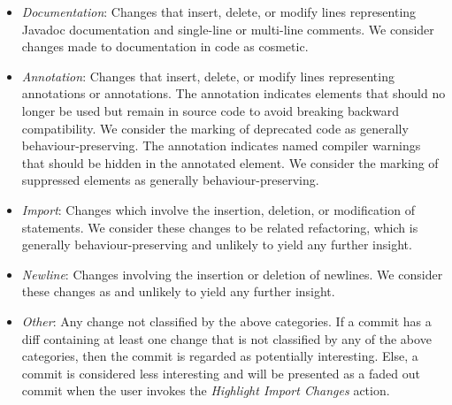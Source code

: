 \begin{itemize}
    \item \textit{Documentation}: Changes that insert, delete, or modify lines representing Javadoc documentation and single-line or multi-line comments. We consider changes made to documentation in code as cosmetic.
    \item \textit{Annotation}: \sloppy Changes that insert, delete, or modify lines representing  annotations or  annotations. The  annotation indicates elements that should no longer be used but remain in source code to avoid breaking backward compatibility. We consider the marking of deprecated code as generally behaviour-preserving. The  annotation indicates named compiler warnings that should be hidden in the annotated element. We consider the marking of  suppressed elements as generally behaviour-preserving.
    \item \textit{Import}: Changes which involve the insertion, deletion, or modification of  statements. We consider these changes to be related refactoring, which is generally behaviour-preserving and unlikely to yield any further insight.
    \item \textit{Newline}: Changes involving the insertion or deletion of newlines. We consider these changes as  and unlikely to yield any further insight.
    \item \textit{Other}: Any change not classified by the above categories. If a commit has a diff containing at least one change that is not classified by any of the above categories, then the commit is regarded as potentially interesting. Else, a commit is considered less interesting and will be presented as a faded out commit when the user invokes the \emph{Highlight Import Changes} action.
\end{itemize}


